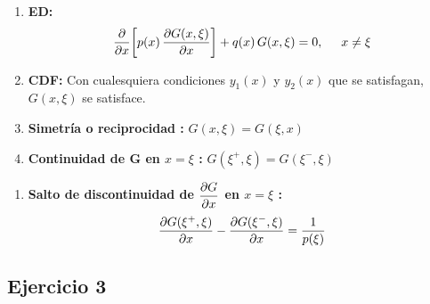\documentclass[12pt]{beamer}
\begin{document}
\begin{frame}[plain]
\begin{tcolorbox}[title={\centering Propiedades de la función de Green}]
\begin{enumerate}[<+->]
\item \textbf{ED:}
\begin{align*}
\pdv{x} \bigg[ p (x) \, \pdv{G (x, \xi)}{x} \bigg] + q (x) \, G (x, \xi) = 0, \hspace{0.5cm} x \neq \xi
\end{align*}
\item \textbf{CDF: } Con cualesquiera condiciones $y_{1} (x)$ y $y_{2} (x)$ que se satisfagan, $G (x, \xi)$ se satisface.
\item \textbf{Simetría o reciprocidad :} $G (x, \xi) = G (\xi, x)$
\item \textbf{Continuidad de $\mathbf{G}$ en $x = \xi$ :} $G (\xi^{+}, \xi) = G (\xi^{-}, \xi)$
\seti
\end{enumerate}
\end{tcolorbox}
\end{frame}
\begin{frame}[plain]
\begin{tcolorbox}[title={\centering Propiedades de la función de Green}]
\begin{enumerate}[<+->]
\conti
\item \textbf{Salto de discontinuidad de $\displaystyle \pdv{G}{x}$ en $x = \xi$ :}
\begin{align*}
\pdv{G (\xi^{+}, \xi)}{x} - \pdv{G (\xi^{-}, \xi)}{x} = \dfrac{1}{p (\xi)}
\end{align*}
\end{enumerate}
\end{tcolorbox}
\end{frame}

\subsection*{Ejercicio 3}
\end{document}
